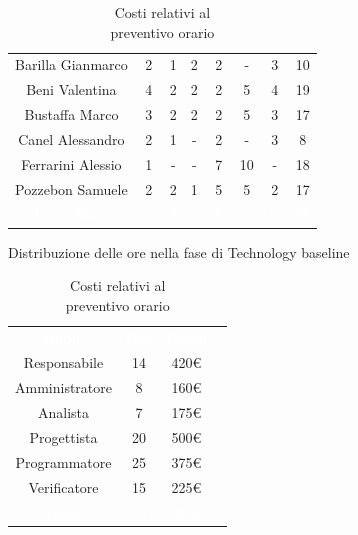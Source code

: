 \begin{table}[h!]
\begin{minipage}[c]{0.53\textwidth}
\begin{tabular}{>{\raggedright\arraybackslash}c|cccccc|c}
		\rowcolor[RGB]{216, 235, 171}
	    	Barilla Gianmarco & 2 & 1 & 2 & 2 & - & 3& 10		\\[4pt]
	    \rowcolor[RGB]{233, 245, 206}
	    	Beni Valentina & 4 & 2 & 2 & 2 & 5 & 4& 19			\\[4pt]
	    \rowcolor[RGB]{216, 235, 171}
	    	Bustaffa Marco & 3 & 2 & 2 & 2 & 5 & 3& 17			\\[4pt]
        \rowcolor[RGB]{233, 245, 206}
	    	Canel Alessandro & 2 & 1 & - & 2 & - & 3& 8			\\[4pt]
        \rowcolor[RGB]{216, 235, 171}
	    	Ferrarini Alessio & 1 & - & - & 7 & 10 & -& 18		\\[4pt]
        \rowcolor[RGB]{233, 245, 206}
	    	Pozzebon Samuele & 2 & 2 & 1 & 5 & 5 & 2& 17			\\[4pt]
		\rowcolor[RGB]{47, 106, 73}
			\textcolor{white}{Totale Ruolo} & \textcolor{white}{14} & \textcolor{white}{8} & \textcolor{white}{7} 
			& \textcolor{white}{20} & \textcolor{white}{25} & \textcolor{white}{15}
			& \textcolor{white}{89} \\[4pt]	
    \end{tabular}
    \caption{Distribuzione delle ore nella fase di Technology baseline}
\end{minipage}
\hfill
\begin{minipage}{0.33\textwidth}
	\centering
	\begin{tabular}{cccc}
	    \rowcolor[RGB]{33, 73, 50}
	    \textcolor{white}{\textbf{Ruolo}} & \textcolor{white}{\textbf{Ore}} & \textcolor{white}{\textbf{Costo}}\\[4pt]
	    \rowcolor[RGB]{216, 235, 171}
	    Responsabile & 14 & 420\euro\\[4pt]
	    \rowcolor[RGB]{233, 245, 206}
	    Amministratore & 8 & 160\euro\\[4pt]
        \rowcolor[RGB]{216, 235, 171}
	    Analista & 7 & 175\euro\\[4pt]
	    \rowcolor[RGB]{233, 245, 206}
	    Progettista & 20 & 500\euro\\[4pt]
        \rowcolor[RGB]{216, 235, 171}
	    Programmatore & 25 & 375\euro\\[4pt]
	    \rowcolor[RGB]{233, 245, 206}
	    Verificatore & 15 & 225\euro\\[4pt]
		\rowcolor[RGB]{47, 106, 73}
			\textcolor{white}{Totale} & \textcolor{white}{89} & \textcolor{white}{1855\euro}\\[4pt]	
    \end{tabular}	
	\caption{Costi relativi al \\ preventivo orario}
\end{minipage}
\end{table}

